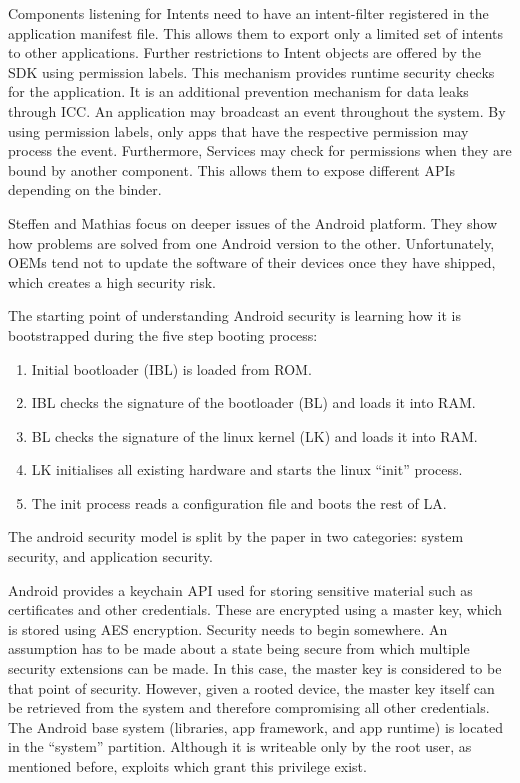 Components listening for Intents need to have an intent-filter registered in the application manifest file. This allows them to export only a limited set of intents to other applications. Further restrictions to Intent objects are offered by the SDK using permission labels. This mechanism provides runtime security checks for the application. It is an additional prevention mechanism for data leaks through ICC. An application may broadcast an event throughout the system. By using permission labels, only apps that have the respective permission may process the event. Furthermore, Services may check for permissions when they are bound by another component. This allows them to expose different APIs depending on the binder.

Steffen and Mathias \cite{liebergeld2013android} focus on deeper issues of the Android platform. They show how problems are solved from one Android version to the other. Unfortunately, OEMs tend not to update the software of their devices once they have shipped, which creates a high security risk.

The starting point of understanding Android security is learning how it is bootstrapped during the five step booting process:
\begin{enumerate}
	\item Initial bootloader (IBL) is loaded from ROM.
	\item IBL checks the signature of the bootloader (BL) and loads it into RAM.
	\item BL checks the signature of the linux kernel (LK) and loads it into RAM.
	\item LK initialises all existing hardware and starts the linux ``init'' process.
	\item The init process reads a configuration file and boots the rest of LA.
\end{enumerate}

The android security model is split by the paper in two categories: system security, and application security.

Android provides a keychain API used for storing sensitive material such as certificates and other credentials. These are encrypted using a master key, which is stored using AES encryption. Security needs to begin somewhere. An assumption has to be made about a state being secure from which multiple security extensions can be made. In this case, the master key is considered to be that point of security. However, given a rooted device, the master key itself can be retrieved from the system and therefore compromising all other credentials. The Android base system (libraries, app framework, and app runtime) is located in the ``system'' partition. Although it is writeable only by the root user, as mentioned before, exploits which grant this privilege exist. 

